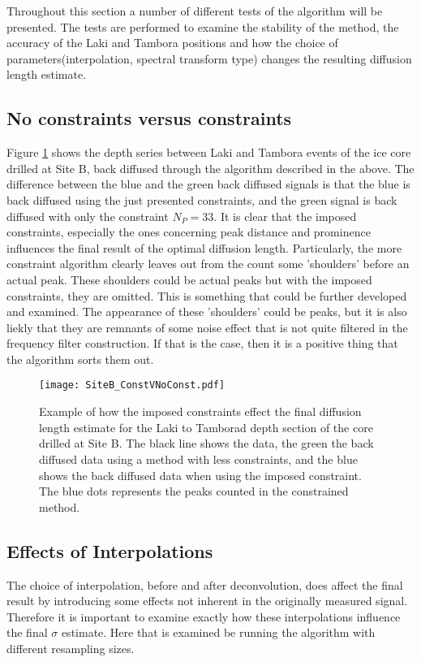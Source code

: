 \documentclass[../../CompleteThesis2/Complete_2ndDraft]{subfiles}
\begin{document}
Throughout this section a number of different tests of the algorithm will be presented. The tests are performed to examine the stability of the method, the accuracy of the Laki and Tambora positions and how the choice of parameters(interpolation, spectral transform type) changes the resulting diffusion length estimate. 

\subsection[Constraints or No Constraints]{No constraints versus constraints}
\label{Subsec:Method_TestStab_ConstNoConst}
Figure \ref{fig:SiteB_ConstVNoConst} shows the depth series between Laki and Tambora events of the ice core drilled at Site B, back diffused through the algorithm described in the above. The difference between the blue and the green back diffused signals is that the blue is back diffused using the just presented constraints, and the green signal is back diffused with only the constraint $N_P=33$. It is clear that the imposed constraints, especially the ones concerning peak distance and prominence influences the final result of the optimal diffusion length. Particularly, the more constraint algorithm clearly leaves out from the count some 'shoulders' before an actual peak. These shoulders could be actual peaks but with the imposed constraints, they are omitted. This is something that could be further developed and examined. The appearance of these 'shoulders' could be peaks, but it is also liekly that they are remnants of some noise effect that is not quite filtered in the frequency filter construction. If that is the case, then it is a positive thing that the algorithm sorts them out.

\begin{figure}[!htb]
	\centering
	\texttt{[image: SiteB\_ConstVNoConst.pdf]}
	\caption[Site B Constrained vs. Unconstrained]{\small Example of how the imposed constraints effect the final diffusion length estimate for the Laki to Tamborad depth section of the core drilled at Site B. The black line shows the data, the green the back diffused data using a method with less constraints, and the blue shows the back diffused data when using the imposed constraint. The blue dots represents the peaks counted in the constrained method.}
	\label{fig:SiteB_ConstVNoConst}
\end{figure}


\subsection[Effects of Interpolations]{Effects of Interpolations}
\label{Subsec:METH_Interpolation}
The choice of interpolation, before and after deconvolution, does affect the final result by introducing some effects not inherent in the originally measured signal. Therefore it is important to examine exactly how these interpolations influence the final $\sigma$ estimate. Here that is examined be running the algorithm with different resampling sizes. 
\end{document}
